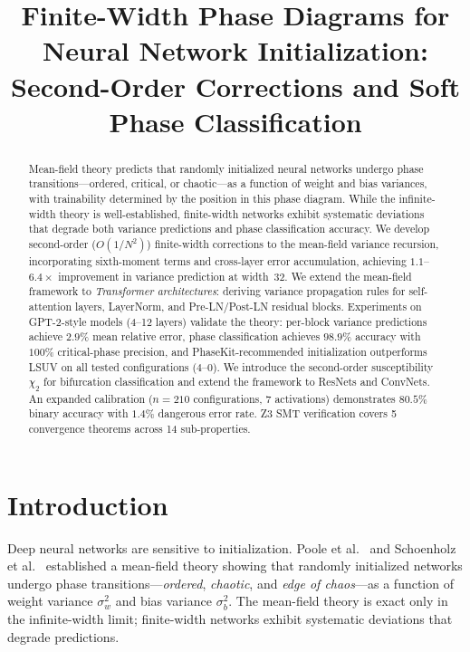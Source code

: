 \documentclass[10pt]{article}
\title{Finite-Width Phase Diagrams for Neural Network Initialization:\\Second-Order Corrections and Soft Phase Classification}
\date{}
\begin{document}
\maketitle

\begin{abstract}
Mean-field theory predicts that randomly initialized neural networks undergo phase transitions---ordered, critical, or chaotic---as a function of weight and bias variances, with trainability determined by the position in this phase diagram.
While the infinite-width theory is well-established, finite-width networks exhibit systematic deviations that degrade both variance predictions and phase classification accuracy.
We develop second-order ($O(1/N^2)$) finite-width corrections to the mean-field variance recursion, incorporating sixth-moment terms and cross-layer error accumulation, achieving $1.1$--$6.4\times$ improvement in variance prediction at width~32.
We extend the mean-field framework to \emph{Transformer architectures}: deriving variance propagation rules for self-attention layers, LayerNorm, and Pre-LN/Post-LN residual blocks.
Experiments on GPT-2-style models (4--12 layers) validate the theory: per-block variance predictions achieve $2.9\%$ mean relative error, phase classification achieves $98.9\%$ accuracy with $100\%$ critical-phase precision, and PhaseKit-recommended initialization outperforms LSUV on all tested configurations ($4$--$0$).
We introduce the second-order susceptibility $\chi_2$ for bifurcation classification and extend the framework to ResNets and ConvNets.
An expanded calibration ($n=210$ configurations, 7 activations) demonstrates $80.5\%$ binary accuracy with $1.4\%$ dangerous error rate.
Z3 SMT verification covers 5 convergence theorems across 14 sub-properties.
\end{abstract}

\section{Introduction}
\label{sec:intro}

Deep neural networks are sensitive to initialization.
Poole et al.~\cite{poole2016exponential} and Schoenholz et al.~\cite{schoenholz2017deep} established a mean-field theory showing that randomly initialized networks undergo phase transitions---\emph{ordered}, \emph{chaotic}, and \emph{edge of chaos}---as a function of weight variance $\sigma_w^2$ and bias variance $\sigma_b^2$.
The mean-field theory is exact only in the infinite-width limit; finite-width networks exhibit systematic deviations that degrade predictions.
\end{document}
